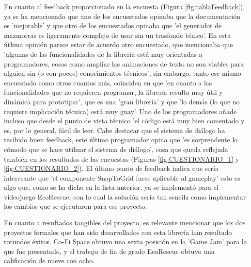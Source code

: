 En cuanto al feedback proporcionado en la encuesta (Figura \ref{fig:tablaFeedback}), ya se ha mencionado que uno de los encuestados opinaba que la documentación es 'mejorable' y que otro de los encuestados opinaba 
que 'el generador de mazmorras es ligeramente complejo de usar sin un trasfondo ténico'. En esta útlima opinión parece estar de acuerdo otro encuestado, que mencionaba que 'algunas de las funcionalidades de la
 librería está muy orientadas a programadores, cosas como ampliar las animaciones de texto no son viables para alguien sin (o con pocos) conocimientos técnicos', sin embargo, tanto ese mismo encuestado como otros 
 cuantos más, coinciden en que 'en cuanto a las funcionalidades que no requieren programar, la librería resulta muy útil y dinámica para prototipar', que es una 'gran librería' y que 'lo demás (lo que no requiere
 implicación técnica) está muy guay'. Uno de los programadores añade incluso que desde el punto de vista técnico 'el código está muy bien comentado y es, por lo general, fácil de leer. Cabe destacar que el sistema de diálogo ha recibido buen feedback, este último programador opina que 'es sorprendente lo cómodo que se hace utilizar el sistema de diálogo', cosa que queda reflejada también
  en los resultados de las encuestas (Figuras \ref{fig:CUESTIONARIO_1} y \ref{fig:CUESTIONARIO_2}). El último punto de feedback indica que sería interesante que 'el componente SnapToGrid fuese aplicable al gameplay'
  esto es algo que, como se ha dicho en la lista anterior, ya se implementó para el videojuego EcoRescue, con lo cual la solución sería tan sencila como implementar los cambios que se ejecutaron para ese proyecto.

En cuanto a resultados tangibles del proyecto, es relevante mencionar que los dos proyectos formales que han sido desarrollados con esta librería han resultado rotundos éxitos. Co-Fi Space obtuvo una sexta posición en 
la 'Game Jam' para la que fue presentado, y el trabajo de fin de grado EcoRescue obtuvo una calificación de nueve con ocho. 
